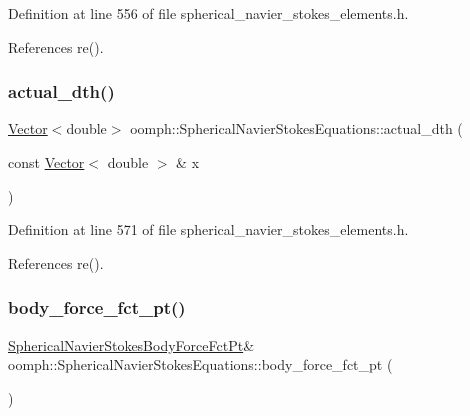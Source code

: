 Definition at line 556 of file spherical\+\_\+navier\+\_\+stokes\+\_\+elements.\+h.



References re().

\mbox{\label{classoomph_1_1SphericalNavierStokesEquations_ac4b121994e36314a10bafa55eb61fc09}} 
\subsubsection{\texorpdfstring{actual\+\_\+dth()}{actual\_dth()}}
{\footnotesize\ttfamily \hyperlink{classoomph_1_1Vector}{Vector}$<$double$>$ oomph\+::\+Spherical\+Navier\+Stokes\+Equations\+::actual\+\_\+dth (\begin{DoxyParamCaption}\item[{const \hyperlink{classoomph_1_1Vector}{Vector}$<$ double $>$ \&}]{x }\end{DoxyParamCaption})\hspace{0.3cm}{\ttfamily [inline]}}



Definition at line 571 of file spherical\+\_\+navier\+\_\+stokes\+\_\+elements.\+h.



References re().

\mbox{\label{classoomph_1_1SphericalNavierStokesEquations_af8453d00310f9e090ad466fe1b93ca36}} 
\subsubsection{\texorpdfstring{body\+\_\+force\+\_\+fct\+\_\+pt()}{body\_force\_fct\_pt()}\hspace{0.1cm}{\footnotesize\ttfamily [1/2]}}
{\footnotesize\ttfamily \hyperlink{classoomph_1_1SphericalNavierStokesEquations_aee36bea87063e9648a488de9e21f551d}{Spherical\+Navier\+Stokes\+Body\+Force\+Fct\+Pt}\& oomph\+::\+Spherical\+Navier\+Stokes\+Equations\+::body\+\_\+force\+\_\+fct\+\_\+pt (\begin{DoxyParamCaption}{ }\end{DoxyParamCaption})\hspace{0.3cm}{\ttfamily [inline]}}



